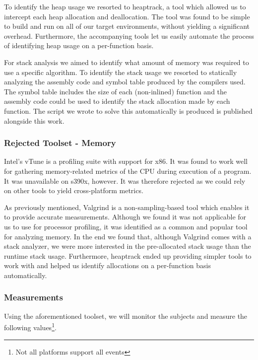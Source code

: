 To identify the heap usage we resorted to heaptrack, a tool which allowed us to intercept each heap allocation and deallocation. The tool was found to be simple to build and run on all of our target environments, without yielding a significant overhead. Furthermore, the accompanying tools let us easily automate the process of identifying heap usage on a per-function basis.

For stack analysis we aimed to identify what amount of memory was required to use a specific algorithm. To identify the stack usage we resorted to statically analyzing the assembly code and symbol table produced by the compilers used. The symbol table includes the size of each (non-inlined) function and the assembly code could be used to identify the stack allocation made by each function. The script we wrote to solve this automatically is produced is published alongside this work.

\subsubsection{Rejected Toolset - Memory}
\label{section:method:experiment:phase1:rejected-toolset-memory}

Intel's vTune is a profiling suite with support for x86. It was found to work well for gathering memory-related metrics of the CPU during execution of a program. It was unavailable on \gls{s390x}, however. It was therefore rejected as we could rely on other tools to yield cross-platform metrics. 

As previously mentioned, Valgrind is a non-sampling-based tool which enables it to provide accurate measurements. Although we found it was not applicable for us to use for processor profiling, it was identified as a common and popular tool for analyzing memory. In the end we found that, although Valgrind comes with a stack analyzer, we were more interested in the pre-allocated stack usage than the runtime stack usage. Furthermore, heaptrack ended up providing simpler tools to work with and helped us identify allocations on a per-function basis automatically.

\subsubsection{Measurements}
\label{section:method:experiment:phase1:measurements}

Using the aforementioned toolset, we will monitor the subjects and measure the following values\footnote{Not all platforms support all events}.

